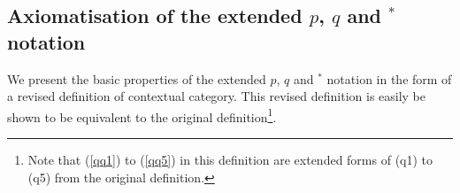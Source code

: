 \subsection{Axiomatisation of the extended $p$, $q$ and $^*$ notation}
\newcommand{\ssub}{\kern-2pt^*\kern-1pt}
\renewcommand{\sub}{^*\kern-1pt}
\newcommand{\hash}{^\#}
\newcommand{\byaxiom}[1]{by axiom (\ref{#1})}
%
\newcommand{\pp}[2]{p_{#1,#2}}

%
\newcommand{\extq}[2]{q(#1,#2)}   
%
\newcommand{\dsub}{^{\ast \kern-1pt \ast}\kern-2pt}

\newcommand{\pbartag}[1]{$P#1$}

We present the basic properties of the extended $p$, $q$ and $^*$ notation in the form of a  revised definition of contextual category. This revised definition is easily be shown to be  equivalent to the original definition\footnote{Note that (\ref{qq1}) to (\ref{qq5}) in this definition are extended forms of  (q1) to (q5) from the original definition.}.

